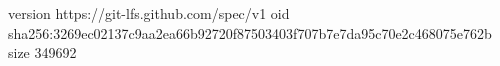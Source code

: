 version https://git-lfs.github.com/spec/v1
oid sha256:3269ec02137c9aa2ea66b92720f87503403f707b7e7da95c70e2c468075e762b
size 349692
